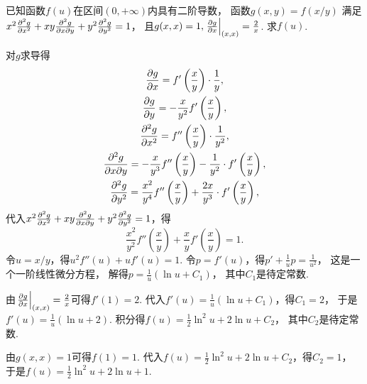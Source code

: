 \begin{example}
已知函数\(f(u)\)在区间\((0,+\infty)\)内具有二阶导数，
函数\(g(x,y) = f(x/y)\)
满足\(x^2 \pdv[2]{g}{x} + xy \pdv[2]{g}{x}{y} + y^2 \pdv[2]{g}{y} = 1\)，
且\(g(x,x) = 1,
\eval{\pdv{g}{x}}_{(x,x)} = \frac2x\).
求\(f(u)\).
\begin{solution}
对\(g\)求导得\begin{gather*}
	\pdv{g}{x}
	= f'\left( \frac{x}{y} \right) \cdot \frac1y, \\
	\pdv{g}{y}
	= -\frac{x}{y^2} f'\left( \frac{x}{y} \right), \\
	\pdv[2]{g}{x}
	= f''\left( \frac{x}{y} \right) \cdot \frac1{y^2}, \\
	\pdv[2]{g}{x}{y}
	= -\frac{x}{y^3} f''\left( \frac{x}{y} \right) - \frac1{y^2} \cdot f'\left( \frac{x}{y} \right), \\
	\pdv[2]{g}{y}
	= \frac{x^2}{y^4} f''\left( \frac{x}{y} \right) + \frac{2x}{y^3} \cdot f'\left( \frac{x}{y} \right),
\end{gather*}
代入\(x^2 \pdv[2]{g}{x} + xy \pdv[2]{g}{x}{y} + y^2 \pdv[2]{g}{y} = 1\)，得\begin{equation*}
	\frac{x^2}{y^2} f''(\frac{x}{y}) + \frac{x}{y} f'\left( \frac{x}{y} \right) = 1.
\end{equation*}
令\(u=x/y\)，得\(u^2 f''(u) + u f'(u) = 1\).
令\(p=f'(u)\)，得\(p' + \frac1u p = \frac1{u^2}\)，
这是一个一阶线性微分方程，
解得\(p = \frac1u (\ln u + C_1)\)，
其中\(C_1\)是待定常数.

由\(\eval{\pdv{g}{x}}_{(x,x)} = \frac2x\)可得\(f'(1)=2\).
代入\(f'(u) = \frac1u (\ln u + C_1)\)，得\(C_1=2\)，
于是\(f'(u) = \frac1u (\ln u + 2)\).
积分得\(f(u) = \frac12 \ln^2 u + 2 \ln u + C_2\)，
其中\(C_2\)是待定常数.

由\(g(x,x) = 1\)可得\(f(1)=1\).
代入\(f(u) = \frac12 \ln^2 u + 2 \ln u + C_2\)，得\(C_2=1\)，
于是\(f(u) = \frac12 \ln^2 u + 2 \ln u + 1\).
\end{solution}
\end{example}
